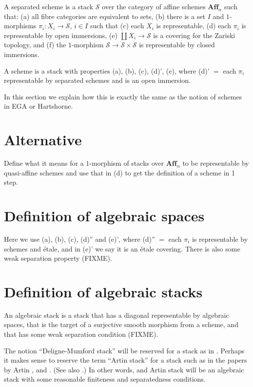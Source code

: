 \noindent
A separated scheme is a stack $\mathcal{S}$ over the category of affine 
schemes $\mathbf{Aff}_\alpha$ such that: (a) all fibre categories are 
equivalent to sets, (b) there is a set $I$ and $1$-morphisms
$\pi_i : X_i \to \mathcal{S}$, $i\in I$ such that (c) each $X_i$ is
representable, (d) each $\pi_i$ is representable by open immersions,
(e) $\coprod X_i \to \mathcal{S}$ is a covering for the Zariski topology, 
and (f) the $1$-morphism $\mathcal{S} \to \mathcal{S}\times \mathcal{S}$ is
representable by closed immersions. 

\medskip\noindent
A scheme is a stack with properties (a), (b), (c), (d)', (e), where
(d)' $=$ each $\pi_i$ representable by separated schemes and is an open 
immersion. 

\medskip\noindent
In this section we explain how this is exactly the same as the notion of
schemes in EGA or Hartshorne.

\section{Alternative}
\label{section-schemes-alternative}

\noindent 
Define what it means for a $1$-morphism of stacks over $\textbf{Aff}_\alpha$
to be representable by quasi-affine schemes and use that in (d) to get the
definition of a scheme in 1 step.

\section{Definition of algebraic spaces}
\label{section-definition-algebraic-spaces}

\noindent
Here we use (a), (b), (c), (d)'' and (e)', where
(d)'' $=$ each $\pi_i$ is representable by schemes and \'etale, and
in (e)' we say it is an \'etale covering. There is also some weak
separation property (FIXME).

\section{Definition of algebraic stacks}
\label{section-definition-algebraic-stacks}

\noindent
An algebraic stack is a stack that has a diagonal representable by algebraic
spaces, that is the target of a surjective smooth morphism from a scheme,
and that has some weak separation condition (FIXME).

\medskip\noindent
The notion ``Deligne-Mumford stack'' will be reserved for a stack as in 
\cite{DM}. Perhaps it makes sense to reserve the term ``Artin stack'' for
a stack such as in the papers by Artin \cite{ArtinI}, and \cite{ArtinVersal}.
(See also \cite{ConradeJong}.) In other words, and Artin stack will be an
algebraic stack with some reasonable finiteness and separatedness conditions.

